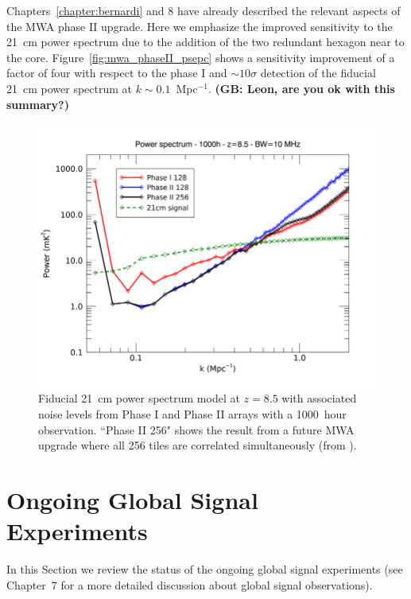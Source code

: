 Chapters~\ref{chapter:bernardi} and 8 have already described the relevant aspects of the MWA phase II upgrade. Here we emphasize the improved sensitivity to the 21~cm power spectrum due to the addition of the two redundant hexagon near to the core. Figure~\ref{fig:mwa_phaseII_psepc} shows a sensitivity improvement of a factor of four with respect to the phase I and $\sim 10\sigma$ detection of the fiducial 21~cm power spectrum at $k \sim 0.1$~Mpc$^{-1}$. {\bf (GB: Leon, are you ok with this summary?)}
\begin{figure}[]
\begin{center}
\includegraphics[width=1.\textwidth]{Koopmans_Bernardi/mwa_phaseII_pspec}
\end{center}
\caption{Fiducial 21~cm power spectrum model at $z = 8.5$ with associated noise levels from Phase I and Phase II arrays with a 1000~hour observation. ``Phase II 256" shows the result from a future MWA upgrade where all 256 tiles are correlated simultaneously (from \cite{wayth18}).}
\label{fig:fig_mwa_phaseII_pspec}
\end{figure}




\section{Ongoing Global Signal Experiments}

In this Section we review the status of the ongoing global signal experiments (see Chapter~7 for a more detailed discussion about global signal observations).

